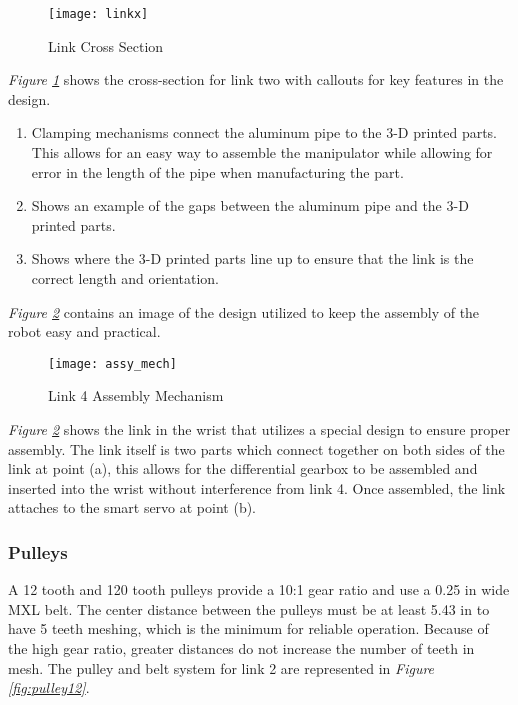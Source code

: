 \begin{figure}[htp]
  \center
  \texttt{[image: linkx]}
  \caption{Link Cross Section}
  \label{fig:linkx}
\end{figure}

\emph{Figure \ref{fig:linkx}} shows the cross-section for link two with callouts for key features in the design.
\begin{enumerate}[label=\alph*.]
  \item {Clamping mechanisms} connect the aluminum pipe to the 3-D printed parts. This allows for an easy way to assemble the manipulator while allowing for error in the length of the pipe when manufacturing the part.
  \item Shows an example of the gaps between the aluminum pipe and the 3-D printed parts.
  \item Shows where the 3-D printed parts line up to ensure that the link is the correct length and orientation.
\end{enumerate}
\emph{Figure \ref{fig:assy_mech}} contains an image of the design utilized to keep the assembly of the robot easy and practical.
\newpage

\begin{figure}[htp]
  \center
  \texttt{[image: assy\_mech]}
  \caption{Link 4 Assembly Mechanism}
  \label{fig:assy_mech}
\end{figure}

\emph{Figure \ref{fig:assy_mech}}  shows the link in the wrist that utilizes a special design to ensure proper assembly. The link itself is two parts which connect together on both sides of the link at point (a), this allows for the differential gearbox to be assembled and inserted into the wrist without interference from link 4. Once assembled, the link attaches to the smart servo at point (b).

\subsubsection{Pulleys}
A 12 tooth and 120 tooth pulleys provide a 10:1 gear ratio and use a 0.25 in wide MXL belt. The center distance between the pulleys must be at least 5.43 in to have 5 teeth meshing, which is the minimum for reliable operation. Because of the high gear ratio, greater distances do not increase the number of teeth in mesh. The pulley and belt system for link 2 are represented in \emph{Figure \ref{fig:pulley12}}.

